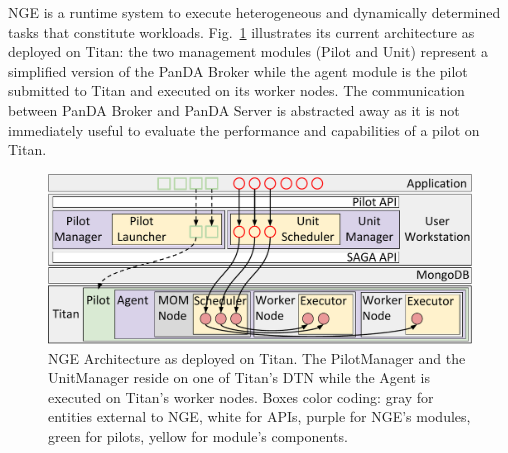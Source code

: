
NGE is a runtime system to execute heterogeneous and dynamically determined
tasks that constitute workloads. Fig.~\ref{fig:arch-overview} illustrates its
current architecture as deployed on Titan: the two management modules (Pilot
and Unit) represent a simplified version of the PanDA Broker while the agent
module is the pilot submitted to Titan and executed on its worker nodes. The
communication between PanDA Broker and PanDA Server is abstracted away as it
is not immediately useful to evaluate the performance and capabilities of a
pilot on Titan.


\begin{figure}
  \centering
   \includegraphics[width=\columnwidth]{figures/rp_architecture_compact_atlaswms_paper.pdf}
  \caption{NGE Architecture as deployed on Titan. The PilotManager and the
  UnitManager reside on one of Titan's DTN while the Agent is executed on
  Titan's worker nodes. Boxes color coding: gray for entities external to NGE,
  white for APIs, purple for NGE's modules, green for pilots, yellow for
  module's components.}
\label{fig:arch-overview}
\end{figure}

